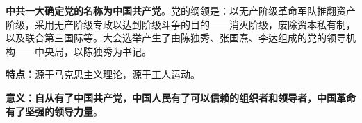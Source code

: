 \textbf{中共一大确定党的名称为中国共产党}。党的纲领是：以无产阶级革命军队推翻资产阶级，采用无产阶级专政以达到阶级斗争的目的{------}消灭阶级，废除资本私有制，以及联合第三国际等。大会选举产生了由陈独秀、张国焘、李达组成的党的领导机构{------}中央局，以陈独秀为书记。{}

\textbf{特点：}源于马克思主义理论，源于工人运动。

\textbf{{意义：自从有了中国共产党，中国人民有了可以信赖的组织者和领导者，中国革命有了坚强的领导力量}}{。}
